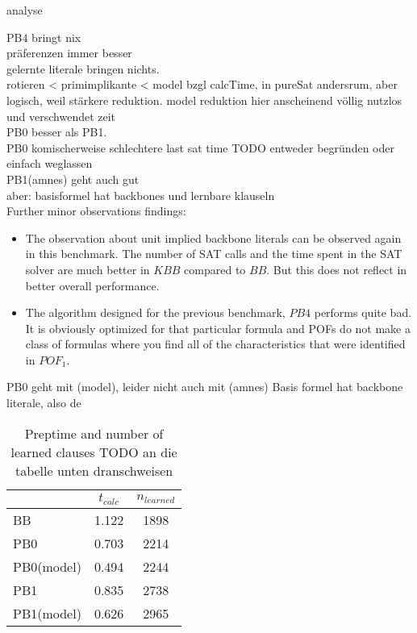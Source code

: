 analyse

PB4 bringt nix\\
präferenzen immer besser\\
gelernte literale bringen nichts.\\
rotieren < primimplikante < model bzgl calcTime, in pureSat andersrum, aber logisch, weil stärkere reduktion. model reduktion hier anscheinend völlig nutzlos und verschwendet zeit\\
PB0 besser als PB1. \\
PB0 komischerweise schlechtere last sat time TODO entweder begründen oder einfach weglassen\\
PB1(amnes) geht auch gut\\
aber: basisformel hat backbones und lernbare klauseln\\

Further minor observations findings:
\begin{itemize}
	\item The observation about unit implied backbone literals can be observed again in this benchmark. The number of SAT calls and the time spent in the SAT solver are much better in $KBB$ compared to $BB$. But this does not reflect in better overall performance.
	\item The algorithm designed for the previous benchmark, $PB4$ performs quite bad. It is obviously optimized for that particular formula and POFs do not make a class of formulas where you find all of the characteristics that were identified in $POF_1$.
\end{itemize}
PB0 geht mit (model), leider nicht auch mit (amnes)
Basis formel hat backbone literale, also de


\begin{wraptable}{R}{6cm}
\begin{tabular}{l| c c}
& $t_{calc}$& $n_{learned}$\\
\hline
BB & 1.122 & 1898 \\
PB0 & 0.703 & 2214 \\
PB0(model) & 0.494 & 2244 \\
PB1 & 0.835 & 2738 \\
PB1(model) & 0.626 & 2965 \\
\end{tabular}
\caption{Preptime and number of learned clauses TODO an die tabelle unten dranschweisen}
\end{wraptable}




